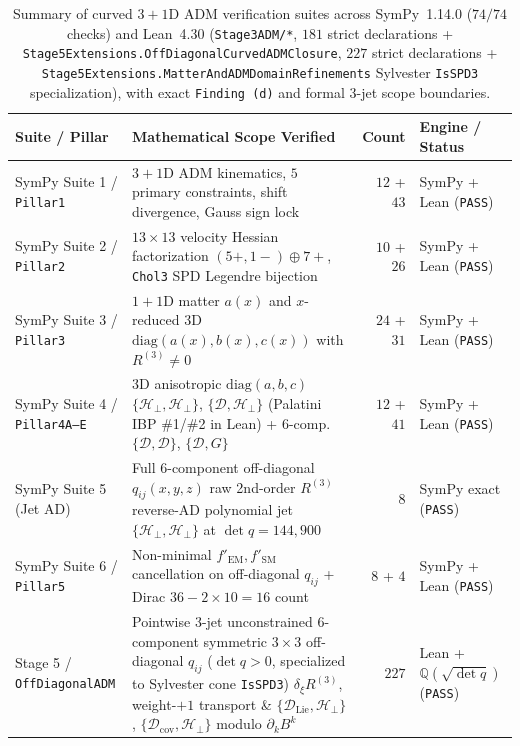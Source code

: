 \begin{table}[htbp]
\centering
\caption{Summary of curved $3+1$D ADM verification suites across SymPy~1.14.0 ($74/74$ checks) and Lean~4.30 (\texttt{Stage3ADM/*}, $181$ strict declarations + \texttt{Stage5\allowbreak{}Extensions.\allowbreak{}Off\allowbreak{}Diagonal\allowbreak{}Curved\allowbreak{}ADMClosure}, $227$ strict declarations + \texttt{Stage5\allowbreak{}Extensions.\allowbreak{}Matter\allowbreak{}And\allowbreak{}ADMDomain\allowbreak{}Refinements} Sylvester \texttt{IsSPD3} specialization), with exact \texttt{Finding (d)} and formal 3-jet scope boundaries.}
\label{tab:curved-adm-suites}
\vspace{0.4em}
\footnotesize
\begin{tabular}{|p{3.0cm}|p{7.1cm}|r|p{2.6cm}|}
\hline
\textbf{Suite / Pillar} & \textbf{Mathematical Scope Verified} & \textbf{Count} & \textbf{Engine / Status} \\
\hline
SymPy Suite 1 / \texttt{Pillar1} & $3+1$D ADM kinematics, $5$ primary constraints, shift divergence, Gauss sign lock & $12$ + $43$ & SymPy + Lean (\texttt{PASS}) \\
\hline
SymPy Suite 2 / \texttt{Pillar2} & $13\times 13$ velocity Hessian factorization $(5+,1-) \oplus 7+$, \texttt{Chol3} SPD Legendre bijection & $10$ + $26$ & SymPy + Lean (\texttt{PASS}) \\
\hline
SymPy Suite 3 / \texttt{Pillar3} & $1+1$D matter $a(x)$ and $x$-reduced 3D $\mathrm{diag}(a(x),b(x),c(x))$ with $R^{(3)} \ne 0$ & $24$ + $31$ & SymPy + Lean (\texttt{PASS}) \\
\hline
SymPy Suite 4 / \texttt{Pillar4A--E} & 3D anisotropic $\mathrm{diag}(a,b,c)$ $\{\mathcal{H}_\perp,\mathcal{H}_\perp\}$, $\{\mathcal{D},\mathcal{H}_\perp\}$ (Palatini IBP \#1/\#2 in Lean) + 6-comp.\ $\{\mathcal{D},\mathcal{D}\}$, $\{\mathcal{D},G\}$ & $12$ + $41$ & SymPy + Lean (\texttt{PASS}) \\
\hline
SymPy Suite 5 (Jet AD) & Full 6-component off-diagonal $q_{ij}(x,y,z)$ raw 2nd-order $R^{(3)}$ reverse-AD polynomial jet $\{\mathcal{H}_\perp,\mathcal{H}_\perp\}$ at $\det q = 144, 900$ & $8$ & SymPy exact (\texttt{PASS}) \\
\hline
SymPy Suite 6 / \texttt{Pillar5} & Non-minimal $f'_{\mathrm{EM}}, f'_{\mathrm{SM}}$ cancellation on off-diagonal $q_{ij}$ + Dirac $36 - 2\times 10 = 16$ count & $8$ + $4$ & SymPy + Lean (\texttt{PASS}) \\
\hline
Stage 5 / \texttt{OffDiagonalADM} & Pointwise 3-jet unconstrained 6-component symmetric $3\times 3$ off-diagonal $q_{ij}$ ($\det q > 0$, specialized to Sylvester cone \texttt{IsSPD3}) $\delta_\xi R^{(3)}$, weight-$+1$ transport \& $\{\mathcal{D}_{\mathrm{Lie}},\mathcal{H}_\perp\}$, $\{\mathcal{D}_{\mathrm{cov}},\mathcal{H}_\perp\}$ modulo $\partial_k B^k$ & $227$ & Lean + $\mathbb{Q}(\sqrt{\det q})$ (\texttt{PASS}) \\
\hline
\end{tabular}
\end{table}

